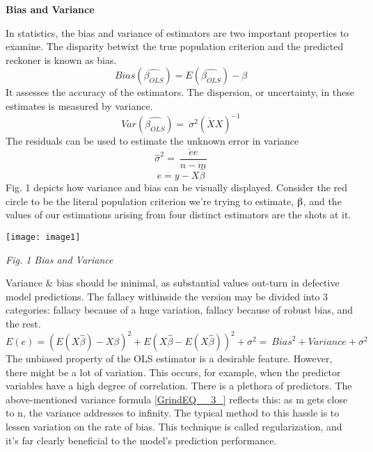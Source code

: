 \documentclass{article} %
\begin{document}
\noindent 

\noindent \textbf{Bias and Variance}

\noindent In statistics, the bias and variance of estimators are two important properties to examine. The disparity betwixt the true population criterion and the predicted reckoner is known as bias.
\begin{equation} \label{GrindEQ__1_} 
Bias\left(\widehat{{\beta }_{OLS}}\right)=E\left(\widehat{{\beta }_{OLS}}\right)-\beta  
\end{equation} 
It assesses the accuracy of the estimators. The dispersion, or uncertainty, in these estimates is measured by variance. 
\begin{equation} \label{GrindEQ__2_} 
Var\left(\widehat{{\beta }_{OLS}}\right)=\ {\sigma }^2{\left(\acute{X}X\right)}^{-1} 
\end{equation} 
The residuals can be used to estimate the unknown error in variance
\[{\widehat{\sigma }}^2=\ \frac{\acute{e}e}{n-m}\] 
\begin{equation} \label{GrindEQ__3_} 
e=y-X\widehat{\beta } 
\end{equation} 
Fig. 1 depicts how variance and bias can be visually displayed. Consider the red circle to be the literal population criterion we're trying to estimate, $\betaup$, and the values of our estimations arising from four distinct estimators are the shots at it.

\noindent \texttt{[image: image1]}

\noindent \textit{Fig. 1 Bias and Variance}

\noindent 

\noindent Variance \& bias should be minimal, as substantial values out-turn in defective model predictions. The fallacy withinside the version may be divided into 3 categories: fallacy because of a huge variation, fallacy because of robust bias, and the rest.
\begin{equation} \label{GrindEQ__4_} 
E\left(e\right)={\left(E\left(X\widehat{\beta }\right)-X\beta \right)}^2+{E(X\widehat{\beta }-E(X\widehat{\beta }))}^2+{\sigma }^2=\ {Bias}^2+Variance+{\sigma }^2 
\end{equation} 
The unbiased property of the OLS estimator is a desirable feature. However, there might be a lot of variation. This occurs, for example, when the predictor variables have a high degree of correlation. There is a plethora of predictors. The above-mentioned variance formula \eqref{GrindEQ__3_} reflects this: as m gets close to n, the variance addresses to infinity. The typical method to this hassle is to lessen variation on the rate of bias. This technique is called regularization, and it's far clearly beneficial to the model's prediction performance.
\end{document}
